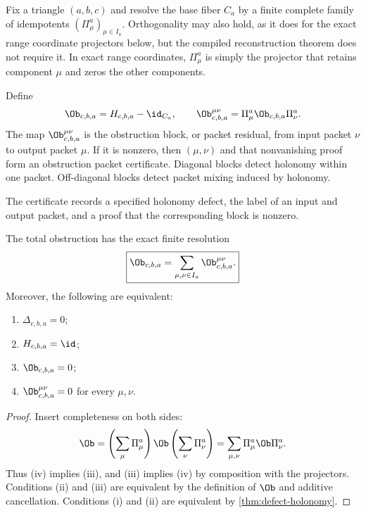 Fix a triangle $(a,b,c)$ and resolve the base fiber $C_a$ by a finite complete
family of idempotents $(\Pi^a_\mu)_{\mu\in I_a}$.  Orthogonality may also hold,
as it does for the exact range coordinate projectors below, but the compiled
reconstruction theorem does not require it.  In exact range coordinates,
$\Pi^a_\mu$ is simply the projector that retains component $\mu$ and zeros
the other components.

\begin{definition}
\label{def:obstruction-packet}
Define
\[
\Ob_{c,b,a}=H_{c,b,a}-\id_{C_a},
\qquad
\Ob^{\mu\nu}_{c,b,a}
=
\Pi^a_\mu\Ob_{c,b,a}\Pi^a_\nu.
\]
The map $\Ob^{\mu\nu}_{c,b,a}$ is the obstruction block, or packet residual,
from input packet $\nu$ to output packet $\mu$.  If it is nonzero, then
$(\mu,\nu)$ and that nonvanishing proof form an obstruction packet
certificate.  Diagonal blocks detect holonomy within one packet.  Off-diagonal
blocks detect packet mixing induced by holonomy.
\end{definition}

The certificate records a specified holonomy defect, the label of an input
and output packet, and a proof that the corresponding block is nonzero.

\begin{theorem}
\label{thm:obstruction-detection}
The total obstruction has the exact finite resolution
\[
\boxed{
\Ob_{c,b,a}
=
\sum_{\mu,\nu\in I_a}
\Ob^{\mu\nu}_{c,b,a}.
}
\]
Moreover, the following are equivalent:
\begin{enumerate}[label=(\roman*)]
\item $\Delta_{c,b,a}=0$;
\item $H_{c,b,a}=\id$;
\item $\Ob_{c,b,a}=0$;
\item $\Ob^{\mu\nu}_{c,b,a}=0$ for every $\mu,\nu$.
\end{enumerate}
\end{theorem}

\begin{proof}
Insert completeness on both sides:
\[
\Ob
=
\left(\sum_\mu\Pi^a_\mu\right)
\Ob
\left(\sum_\nu\Pi^a_\nu\right)
=
\sum_{\mu,\nu}\Pi^a_\mu\Ob\Pi^a_\nu.
\]
Thus (iv) implies (iii), and (iii) implies (iv) by composition with the
projectors.  Conditions (ii) and (iii) are equivalent by the definition of
$\Ob$ and additive cancellation.
Conditions (i) and (ii) are equivalent by
\cref{thm:defect-holonomy}.
\end{proof}

